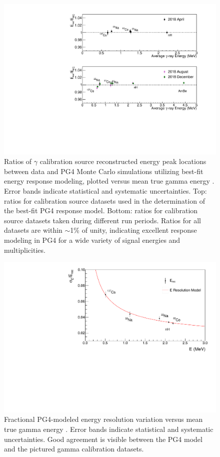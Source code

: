 \begin{figure}[h]
	\centering
	\includegraphics[width=0.7\linewidth]{tex/5-analysis-images/GammaScale}
	\caption[]{Ratios of $\gamma$ calibration source reconstructed energy peak locations between data and PG4 Monte Carlo simulations utilizing best-fit energy response modeling, plotted versus mean true gamma energy \cite{XZhang:2815}. Error bands indicate statistical and systematic uncertainties. Top: ratios for calibration source datasets used in the determination of the best-fit PG4 response model. Bottom: ratios for calibration source datasets taken during different run periods. Ratios for all datasets are within $\sim$1\% of unity, indicating excellent response modeling in PG4 for a wide variety of signal energies and multiplicities.}
	\label{fig:gammascale}
\end{figure}

\begin{figure}[h]
	\centering
	\includegraphics[width=0.7\linewidth]{tex/5-analysis-images/GammaRes}
	\caption[]{Fractional PG4-modeled energy resolution variation versus mean true gamma energy \cite{XZhang:2815}. Error bands indicate statistical and systematic uncertainties. Good agreement is visible between the PG4 model and the pictured gamma calibration datasets.}
	\label{fig:gammares}
\end{figure}




